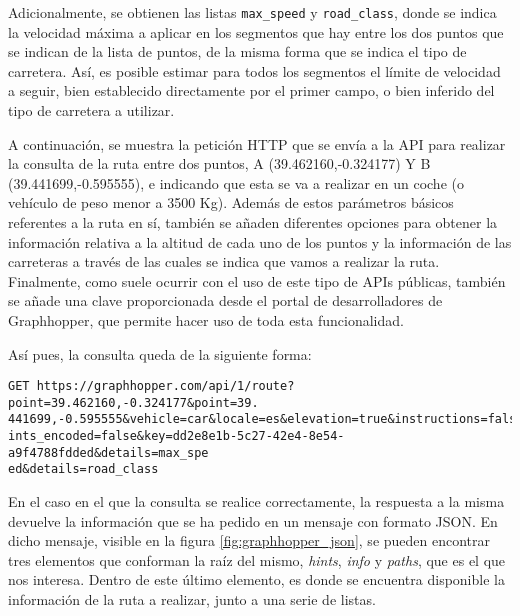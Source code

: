 \documentclass[11pt,spanish,listoffigures,listoftables]{tfgetsinf}
\begin{document}
Adicionalmente, se obtienen las listas \verb|max_speed| y \verb|road_class|, donde se indica la velocidad máxima a aplicar en los segmentos que hay entre los dos puntos que se indican de la lista de puntos, de la misma forma que se indica el tipo de carretera. Así, es posible estimar para todos los segmentos el límite de velocidad a seguir, bien establecido directamente por el primer campo, o bien inferido del tipo de carretera a utilizar.

A continuación, se muestra la petición HTTP que se envía a la API para realizar la consulta de la ruta entre dos puntos, A (39.462160,-0.324177) Y B (39.441699,-0.595555), e indicando que esta se va a realizar en un coche (o vehículo de peso menor a 3500 Kg). Además de estos parámetros básicos referentes a la ruta en sí, también se añaden diferentes opciones para obtener la información relativa a la altitud de cada uno de los puntos y la información de las carreteras a través de las cuales se indica que vamos a realizar la ruta. Finalmente, como suele ocurrir con el uso de este tipo de APIs públicas, también se añade una clave proporcionada desde el portal de desarrolladores de Graphhopper, que permite hacer uso de toda esta funcionalidad.

\noindent Así pues, la consulta queda de la siguiente forma:
\begin{verbatim}
GET https://graphhopper.com/api/1/route?point=39.462160,-0.324177&point=39.
441699,-0.595555&vehicle=car&locale=es&elevation=true&instructions=false&po
ints_encoded=false&key=dd2e8e1b-5c27-42e4-8e54-a9f4788fdded&details=max_spe
ed&details=road_class
\end{verbatim}

En el caso en el que la consulta se realice correctamente, la respuesta a la misma devuelve la información que se ha pedido en un mensaje con formato JSON. En dicho mensaje, visible en la figura \ref{fig:graphhopper_json}, se pueden encontrar tres elementos que conforman la raíz del mismo, \textit{hints}, \textit{info} y \textit{paths}, que es el que nos interesa. Dentro de este último elemento, es donde se encuentra disponible la información de la ruta a realizar, junto a una serie de listas.
\end{document}
